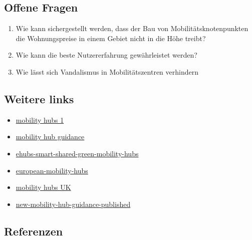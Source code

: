 \documentclass[
]{book}
\providecommand{\tightlist}{%
  \setlength{\itemsep}{0pt}\setlength{\parskip}{0pt}}
\begin{document}
\hypertarget{offene-fragen-26}{%
\subsection*{Offene Fragen}\label{offene-fragen-26}}

\begin{enumerate}
\def\labelenumi{\arabic{enumi}.}
\tightlist
\item
  Wie kann sichergestellt werden, dass der Bau von Mobilitätsknotenpunkten die Wohnungspreise in einem Gebiet nicht in die Höhe treibt?
\item
  Wie kann die beste Nutzererfahrung gewährleistet werden?
\item
  Wie lässt sich Vandalismus in Mobilitätszentren verhindern
\end{enumerate}

\hypertarget{weitere-links-24}{%
\subsection*{Weitere links}\label{weitere-links-24}}

\begin{itemize}
\tightlist
\item
  \href{https://mobility-as-a-service.blog/mobility-hubs/}{mobility hubs 1}
\item
  \href{https://como.org.uk/wp-content/uploads/2019/10/Mobility-Hub-Guide-241019-final.pdf}{mobility hub guidance}
\item
  \href{https://www.nweurope.eu/projects/project-search/ehubs-smart-shared-green-mobility-hubs/}{ehubs-smart-shared-green-mobility-hubs}
\item
  \href{https://www.metro-magazine.com/10122757/a-look-at-european-mobility-hubs}{european-mobility-hubs}
\item
  \href{https://www.intelligenttransport.com/transport-articles/98414/what-the-uk-can-learn-from-europe-on-mobility-hubs-and-shared-transport/}{mobility hubs UK}
\item
  \href{https://www.eltis.org/in-brief/news/new-mobility-hub-guidance-published}{new-mobility-hub-guidance-published}
\end{itemize}

\hypertarget{referenzen-28}{%
\subsection*{Referenzen}\label{referenzen-28}}
\end{document}
